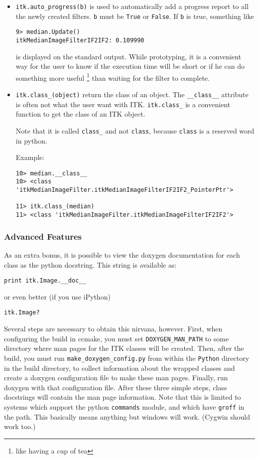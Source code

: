 \documentclass{InsightArticle}
\begin{document}
\begin{itemize}
  \item \verb$itk.auto_progress(b)$ is used to automatically add a progress report
to all the newly created filters. \verb$b$ must be \verb$True$ or \verb$False$. If
\verb$b$ is true, something like
\begin{verbatim}
9> median.Update()
itkMedianImageFilterIF2IF2: 0.109990
\end{verbatim}
is displayed on the standard output. 
While prototyping, it is a convenient way for the user to know if
the execution time will be short or if he can do something more useful
\footnote{like having a cup of tea} than waiting for the filter to complete.

  \item \verb$itk.class_(object)$ return the class of an object. The \verb$__class__$
attribute is often not what the user want with ITK. \verb$itk.class_$ is a convenient
function to get the class of an ITK object.

Note that it is called \verb$class_$ and not \verb$class$, because \verb$class$ is a
reserved word in python.

Example:
\begin{verbatim}
10> median.__class__
10> <class 'itkMedianImageFilter.itkMedianImageFilterIF2IF2_PointerPtr'>

11> itk.class_(median)
11> <class 'itkMedianImageFilter.itkMedianImageFilterIF2IF2'>
\end{verbatim}


\end{itemize}

     \subsubsection{Advanced Features}

As an extra bonus, it is possible to view the doxygen documentation for each
class as the python docstring. This string is available as:
\small \begin{verbatim}
print itk.Image.__doc__
\end{verbatim} \normalsize
or even better (if you use iPython)
\small \begin{verbatim}
itk.Image?
\end{verbatim} \normalsize

Several steps are necessary to obtain this nirvana, however. First, when
configuring the build in ccmake, you must set \verb$DOXYGEN_MAN_PATH$ to some directory
where man pages for the ITK classes will be created. Then, after the build, you
must run \verb$make_doxygen_config.py$ from within the \verb$Python$ directory in the build
directory, to collect information about the wrapped classes and create a doxygen
configuration file to make these man pages. Finally, run doxygen with that
configuration file. After these three simple steps, class docstrings will
contain the man page information. Note that this is limited to systems which
support the python \verb$commands$ module, and which have \verb$groff$ in the path. This
basically means anything but windows \cite{WindowsWebSite} will work. (Cygwin should work too.)
\end{document}
